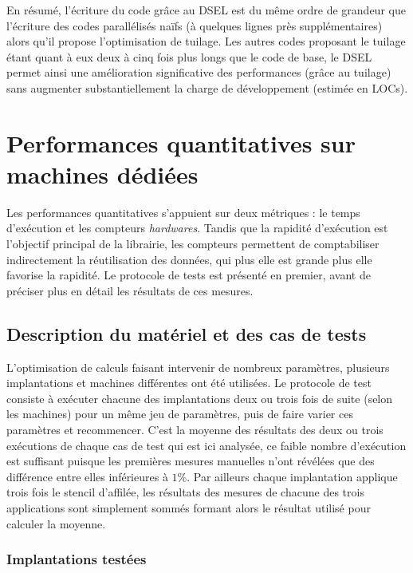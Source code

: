 En résumé, l'écriture du code grâce au DSEL est du même ordre de grandeur que l'écriture des codes parallélisés naïfs (à quelques lignes près supplémentaires) alors qu'il propose l'optimisation de tuilage. Les autres codes proposant le tuilage étant quant à eux deux à cinq fois plus longs que le code de base, le DSEL permet ainsi une amélioration significative des performances (grâce au tuilage) sans augmenter substantiellement la charge de développement (estimée en LOCs).


\section{Performances quantitatives sur machines dédiées}

Les performances quantitatives s'appuient sur deux métriques : le temps d'exécution et les compteurs \emph{hardwares}. Tandis que la rapidité d'exécution est l'objectif principal de la librairie, les compteurs permettent de comptabiliser indirectement la réutilisation des données, qui plus elle est grande plus elle favorise la rapidité. Le protocole de tests est présenté en premier, avant de préciser plus en détail les résultats de ces mesures.

\subsection{Description du matériel et des cas de tests}
\label{sec:desc_mat_tests}

L'optimisation de calculs faisant intervenir de nombreux paramètres, plusieurs implantations et machines différentes ont été utilisées. Le protocole de test consiste à exécuter chacune des implantations deux ou trois fois de suite (selon les machines) pour un même jeu de paramètres, puis de faire varier ces paramètres et recommencer. C'est la moyenne des résultats des deux ou trois exécutions de chaque cas de test qui est ici analysée, ce faible nombre d'exécution est suffisant puisque les premières mesures manuelles n'ont révélées que des différence entre elles inférieures à $1\%$. Par ailleurs chaque implantation applique trois fois le stencil d'affilée, les résultats des mesures de chacune des trois applications sont simplement sommés formant alors le résultat utilisé pour calculer la moyenne.

\subsubsection*{Implantations testées}

